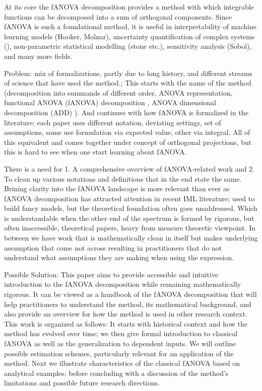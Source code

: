 At its core the fANOVA decomposition provides a method with which integrable functions can be decomposed into a sum of orthogonal components.
Since fANOVA is such a foundational method, it is useful in interpretability of machine learning models (Hooker, Molnar), uncertainty quantification of complex systems (\cite{rahman2014}), non-parametric statistical modelling (stone etc.), sensitivity analysis (Sobol), and many more fields.\par


Problem: mix of formalizations, partly due to long history, and different streams of science that have used the method.;
This starts with the name of the method (decomposition into summands of different order, ANOVA representation, functional ANOVA (fANOVA) decomposition \cite{hooker2004}, ANOVA dimensional decomposition (ADD) \citep{rahman2014}).
And continues with how fANOVA is formalized in the literature; each paper uses different notation, deviating settings, set of assumptions, some use formulation via expected value, other via integral.
All of this equivalent and comes together under concept of orthogonal projections, but this is hard to see when one start learning about fANOVA.\par

There is a need for 1. A comprehensive overview of fANOVA-related work and 2. To clean up various notations and definitions that in the end state the same.
Brining clarity into the fANOVA landscape is more relevant than ever as fANOVA decomposition has attracted attention in recent IML literature; used to build fancy models, but the theoretical foundation often goes unaddressed.
Which is understandable when the other end of the spectrum is formed by rigorous, but often inaccessible, theoretical papers, heavy from measure theoretic viewpoint. In between we have work that is mathematically clean in itself but makes underlying assumption that come not across resulting in practitioners that do not understand what assumptions they are making when using the expression.

Possible Solution: This paper aims to provide accessible and intuitive introduction to the fANOVA decomposition while remaining mathematically rigorous.
It can be viewed as a handbook of the fANOVA decomposition that will help practitioners to understand the method, its mathematical background, and also provide an overview for how the method is used in other research context.
This work is organized as follows: It starts with historical context and how the method has evolved over time; we then give formal introduction to classical fANOVA as well as the generalization to dependent inputs. We will outline possible estimation schemes, particularly relevant for an application of the method. Next we illustrate characteristics of the classical fANOVA based on analytical examples; before concluding with a discussion of the method's limitations and possible future research directions.

